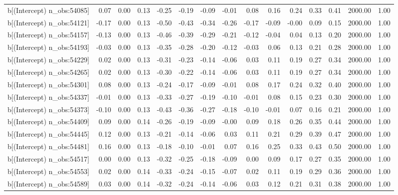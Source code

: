 \begin{table}[ht]
\begin{tabular}{rrrrrrrrrrrrrrr}
  b[(Intercept) n\_obs:54085] & 0.07 & 0.00 & 0.13 & -0.25 & -0.19 & -0.09 & -0.01 & 0.08 & 0.16 & 0.24 & 0.33 & 0.41 & 2000.00 & 1.00 \\ 
  b[(Intercept) n\_obs:54121] & -0.17 & 0.00 & 0.13 & -0.50 & -0.43 & -0.34 & -0.26 & -0.17 & -0.09 & -0.00 & 0.09 & 0.15 & 2000.00 & 1.00 \\ 
  b[(Intercept) n\_obs:54157] & -0.13 & 0.00 & 0.13 & -0.46 & -0.39 & -0.29 & -0.21 & -0.12 & -0.04 & 0.04 & 0.13 & 0.20 & 2000.00 & 1.00 \\ 
  b[(Intercept) n\_obs:54193] & -0.03 & 0.00 & 0.13 & -0.35 & -0.28 & -0.20 & -0.12 & -0.03 & 0.06 & 0.13 & 0.21 & 0.28 & 2000.00 & 1.00 \\ 
  b[(Intercept) n\_obs:54229] & 0.02 & 0.00 & 0.13 & -0.31 & -0.23 & -0.14 & -0.06 & 0.03 & 0.11 & 0.19 & 0.27 & 0.34 & 2000.00 & 1.00 \\ 
  b[(Intercept) n\_obs:54265] & 0.02 & 0.00 & 0.13 & -0.30 & -0.22 & -0.14 & -0.06 & 0.03 & 0.11 & 0.19 & 0.27 & 0.34 & 2000.00 & 1.00 \\ 
  b[(Intercept) n\_obs:54301] & 0.08 & 0.00 & 0.13 & -0.24 & -0.17 & -0.09 & -0.01 & 0.08 & 0.17 & 0.24 & 0.32 & 0.40 & 2000.00 & 1.00 \\ 
  b[(Intercept) n\_obs:54337] & -0.01 & 0.00 & 0.13 & -0.33 & -0.27 & -0.19 & -0.10 & -0.01 & 0.08 & 0.15 & 0.23 & 0.30 & 2000.00 & 1.00 \\ 
  b[(Intercept) n\_obs:54373] & -0.10 & 0.00 & 0.13 & -0.43 & -0.36 & -0.27 & -0.18 & -0.10 & -0.01 & 0.07 & 0.16 & 0.21 & 2000.00 & 1.00 \\ 
  b[(Intercept) n\_obs:54409] & 0.09 & 0.00 & 0.14 & -0.26 & -0.19 & -0.09 & -0.00 & 0.09 & 0.18 & 0.26 & 0.35 & 0.44 & 2000.00 & 1.00 \\ 
  b[(Intercept) n\_obs:54445] & 0.12 & 0.00 & 0.13 & -0.21 & -0.14 & -0.06 & 0.03 & 0.11 & 0.21 & 0.29 & 0.39 & 0.47 & 2000.00 & 1.00 \\ 
  b[(Intercept) n\_obs:54481] & 0.16 & 0.00 & 0.13 & -0.18 & -0.10 & -0.01 & 0.07 & 0.16 & 0.25 & 0.33 & 0.43 & 0.50 & 2000.00 & 1.00 \\ 
  b[(Intercept) n\_obs:54517] & 0.00 & 0.00 & 0.13 & -0.32 & -0.25 & -0.18 & -0.09 & 0.00 & 0.09 & 0.17 & 0.27 & 0.35 & 2000.00 & 1.00 \\ 
  b[(Intercept) n\_obs:54553] & 0.02 & 0.00 & 0.14 & -0.33 & -0.24 & -0.15 & -0.07 & 0.02 & 0.11 & 0.19 & 0.29 & 0.36 & 2000.00 & 1.00 \\ 
  b[(Intercept) n\_obs:54589] & 0.03 & 0.00 & 0.14 & -0.32 & -0.24 & -0.14 & -0.06 & 0.03 & 0.12 & 0.21 & 0.31 & 0.38 & 2000.00 & 1.00 \\ 

\end{tabular}
\end{table}
